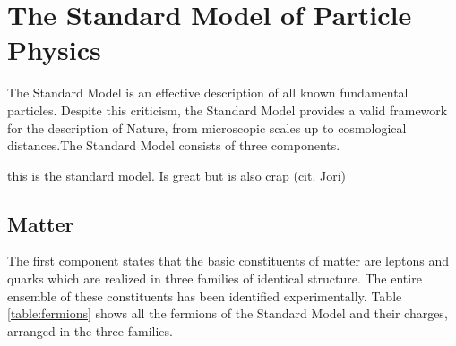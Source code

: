 \section{The Standard Model of Particle Physics}

The Standard Model \cite{Spiesberger:2000ks} is an effective description of all known fundamental particles.  Despite this criticism, the Standard Model provides a valid framework for the description of Nature, from microscopic scales up to cosmological distances.The Standard Model consists of three components.

this is the standard model. Is great but is also crap (cit. Jori)

\subsection{Matter}

The first component states that the basic constituents of matter are leptons and quarks which are realized in three families of identical structure. The entire ensemble of these constituents has been identified experimentally. Table \ref{table:fermions} shows all the fermions of the Standard Model and their charges, arranged in the three families.

